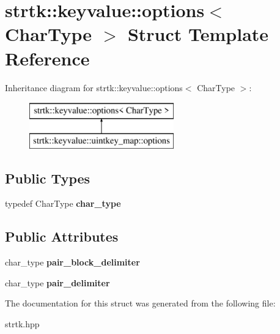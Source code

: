\hypertarget{structstrtk_1_1keyvalue_1_1options}{\section{strtk\-:\-:keyvalue\-:\-:options$<$ Char\-Type $>$ Struct Template Reference}
\label{structstrtk_1_1keyvalue_1_1options}
}
Inheritance diagram for strtk\-:\-:keyvalue\-:\-:options$<$ Char\-Type $>$\-:\begin{figure}[H]
\begin{center}
\leavevmode
\includegraphics[height=2.000000cm]{structstrtk_1_1keyvalue_1_1options}
\end{center}
\end{figure}
\subsection*{Public Types}
\begin{DoxyCompactItemize}
\item 
\hypertarget{structstrtk_1_1keyvalue_1_1options_ad4361678bdc8f766b70451854ec3ba0d}{typedef Char\-Type {\bfseries char\-\_\-type}}\label{structstrtk_1_1keyvalue_1_1options_ad4361678bdc8f766b70451854ec3ba0d}

\end{DoxyCompactItemize}
\subsection*{Public Attributes}
\begin{DoxyCompactItemize}
\item 
\hypertarget{structstrtk_1_1keyvalue_1_1options_ae15030598c80b0bd6f4379107f808990}{char\-\_\-type {\bfseries pair\-\_\-block\-\_\-delimiter}}\label{structstrtk_1_1keyvalue_1_1options_ae15030598c80b0bd6f4379107f808990}

\item 
\hypertarget{structstrtk_1_1keyvalue_1_1options_aa6383930234c4a010de684299528ca4f}{char\-\_\-type {\bfseries pair\-\_\-delimiter}}\label{structstrtk_1_1keyvalue_1_1options_aa6383930234c4a010de684299528ca4f}

\end{DoxyCompactItemize}


The documentation for this struct was generated from the following file\-:\begin{DoxyCompactItemize}
\item 
strtk.\-hpp\end{DoxyCompactItemize}
